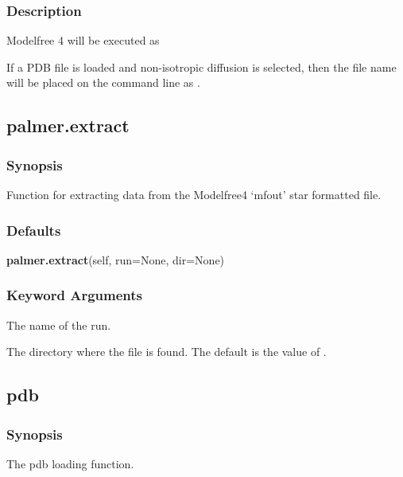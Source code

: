 \subsubsection{Description}

Modelfree 4 will be executed as


If a PDB file is loaded and non-isotropic diffusion is selected, then the file name will be
placed on the command line as 
.


\newpage

\subsection{palmer.extract}


\subsubsection{Synopsis}

Function for extracting data from the Modelfree4 `mfout' star formatted file.

\subsubsection{Defaults}

\textsf{\textbf{palmer.extract}(self, run=None, dir=None)}


\subsubsection{Keyword Arguments}


  The name of the run.

  The directory where the file 
 is found.  The default is the value of 
.


\newpage

\subsection{pdb}


\subsubsection{Synopsis}

The pdb loading function.


